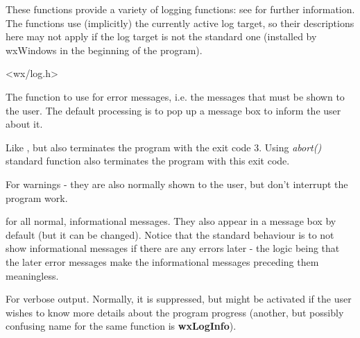 These functions provide a variety of logging functions: see  for
further information. The functions use (implicitly) the currently active log
target, so their descriptions here may not apply if the log target is not the
standard one (installed by wxWindows in the beginning of the program).


<wx/log.h>

\label{wxlogerror}


The function to use for error messages, i.e. the messages that must be shown
to the user. The default processing is to pop up a message box to inform the
user about it.

\label{wxlogfatalerror}


Like , but also
terminates the program with the exit code 3. Using {\it abort()} standard
function also terminates the program with this exit code.

\label{wxlogwarning}


For warnings - they are also normally shown to the user, but don't interrupt
the program work.

\label{wxlogmessage}


for all normal, informational messages. They also appear in a message box by
default (but it can be changed). Notice that the standard behaviour is to not
show informational messages if there are any errors later - the logic being
that the later error messages make the informational messages preceding them
meaningless.

\label{wxlogverbose}


For verbose output. Normally, it is suppressed, but
might be activated if the user wishes to know more details about the program
progress (another, but possibly confusing name for the same function is {\bf wxLogInfo}).

